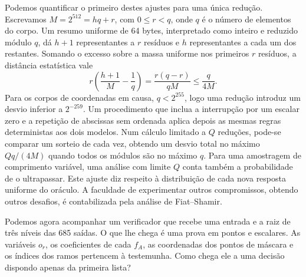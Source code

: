 Podemos quantificar o primeiro destes ajustes para uma única
redução. Escrevamos \(M=2^{512}=hq+r\), com \(0\leq r<q\),
onde \(q\) é o número de elementos do corpo. Um resumo uniforme
de 64 bytes, interpretado como inteiro e reduzido módulo \(q\),
dá \(h+1\) representantes a \(r\) resíduos e \(h\)
representantes a cada um dos restantes. Somando o excesso sobre
a massa uniforme nos primeiros \(r\) resíduos, a distância
estatística vale
\[
 r\left(\frac{h+1}{M}-\frac1q\right)
       =\frac{r(q-r)}{qM}\leq\frac{q}{4M}.
\]
Para os corpos de coordenadas em causa, \(q<2^{255}\), logo
uma redução introduz um desvio inferior a \(2^{-259}\).
Um procedimento que inclua a interrupção por um escalar zero e
a repetição de abscissas sem ordenada aplica depois as mesmas
regras deterministas aos dois modelos. Num cálculo limitado a
\(Q\) reduções, pode-se comparar um sorteio de cada vez,
obtendo um desvio total no máximo \(Qq/(4M)\) quando todos os
módulos são no máximo \(q\). Para uma amostragem de comprimento
variável, uma análise com limite \(Q\) conta também a probabilidade
de o ultrapassar. Este ajuste diz respeito à distribuição de cada
nova resposta uniforme do oráculo. A faculdade de experimentar
outros compromissos, obtendo outros desafios, é contabilizada
pela análise de Fiat--Shamir.

Podemos agora acompanhar um verificador que recebe uma entrada
e a raiz de três níveis das 685 saídas. O que lhe chega é uma
prova em pontos e escalares. As variáveis \(o_r\), os
coeficientes de cada \(f_A\), as coordenadas dos pontos de máscara
e os índices dos ramos pertencem à testemunha. Como chega ele a uma
decisão dispondo apenas da primeira lista?

